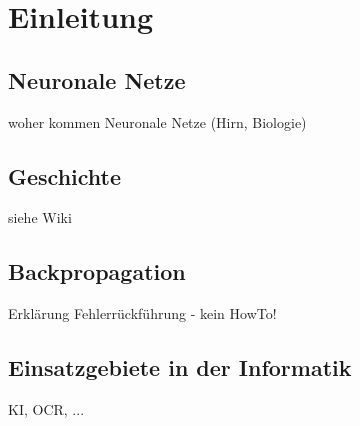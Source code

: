 \section{Einleitung}

\subsection{Neuronale Netze}
woher kommen Neuronale Netze (Hirn, Biologie)

\subsection{Geschichte}
siehe Wiki

\subsection{Backpropagation}
Erklärung Fehlerrückführung - kein HowTo!

\subsection{Einsatzgebiete in der Informatik}
KI, OCR, ...
